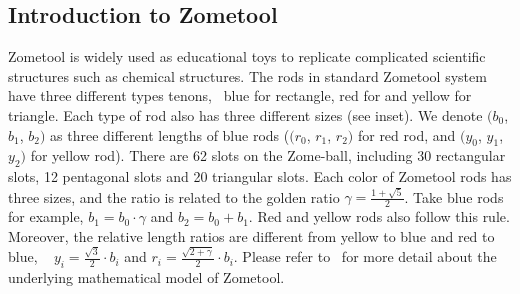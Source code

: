 \subsection{Introduction to Zometool}
Zometool is widely used as educational toys to replicate complicated scientific structures such as chemical structures.
The rods in  standard Zometool system have three different types tenons, \ie~\chinky{,}blue for rectangle, red for  and yellow for triangle.
Each type of rod also has three different sizes (see inset).
We denote $(b_0$, $b_1$, $b_2)$ as three different lengths of blue rods ($(r_0$, $r_1$, $r_2)$ for red rod, and $(y_0$, $y_1$, $y_2)$ for yellow rod).
There are  62 slots on the Zome-ball, including 30 rectangular slots, 12 pentagonal slots\chinky{,} and 20 triangular slots. 
Each color of Zometool rods has three sizes, and the  ratio is related to the golden ratio $\gamma = \frac{1+\sqrt{5}}{2}$. 
Take blue rods for example, $b_1 = b_0 \cdot \gamma$ and $b_2 = b_0 + b_1$. 
Red and yellow rods also follow this rule. 
Moreover, the relative length ratios are different from yellow to blue and red to blue, \ie~\chinky{,} $y_i = \frac{\sqrt{3}}{2} \cdot b_i$ and $r_i = \frac{\sqrt{2 + \gamma}}{2} \cdot b_i$.
Please refer to~\cite{davis2007mathematics} for more detail about the underlying mathematical model of Zometool.



